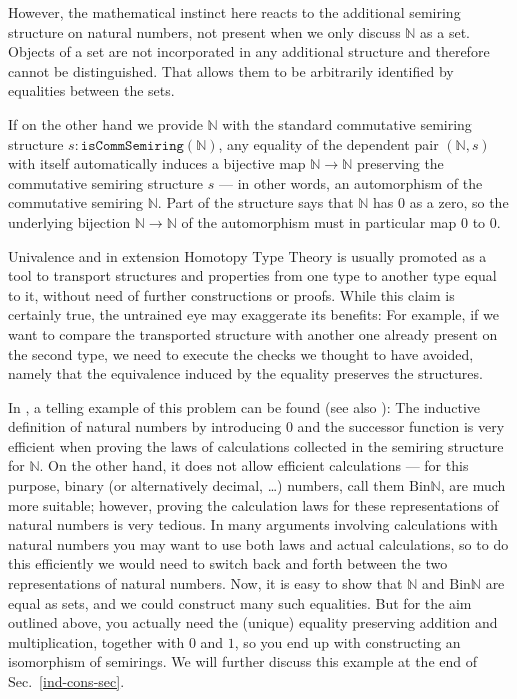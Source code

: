 \documentclass{amsart}
\theoremstyle{plain}
\numberwithin{equation}{section} %
\numberwithin{figure}{section} %
\theoremstyle{plain}
\theoremstyle{plain}
\theoremstyle{plain}
\theoremstyle{plain}
\theoremstyle{plain}
\theoremstyle{plain}
\theoremstyle{remark}
\theoremstyle{remark}
\theoremstyle{remark}
\begin{document}
However, the mathematical instinct here reacts to the additional semiring structure on natural numbers, not present when we only discuss $\mathbb{N}$ as a set. Objects of a set are not incorporated in any additional structure and therefore cannot be distinguished. That allows them to be arbitrarily identified by equalities between the sets.

If on the other hand we provide $\mathbb{N}$ with the standard commutative semiring structure $s : \mathtt{isCommSemiring}(\mathbb{N})$, any equality of the dependent pair $(\mathbb{N}, s)$ with itself automatically induces a bijective map $\mathbb{N} \rightarrow \mathbb{N}$ preserving the commutative semiring structure $s$ --- in other words, an automorphism of the commutative semiring $\mathbb{N}$. Part of the structure says that $\mathbb{N}$ has $0$ as a zero, so the underlying bijection $\mathbb{N} \rightarrow \mathbb{N}$ of the automorphism must in particular map $0$ to $0$. 

Univalence and in extension Homotopy Type Theory is usually promoted as a tool to transport structures and properties from one type to another type equal to it, without need of further constructions or proofs. While this claim is certainly true, the untrained eye may exaggerate its benefits: For example, if we want to compare the transported structure with another one already present on the second type, we need to execute the checks we thought to have avoided, namely that the equivalence induced by the equality preserves the structures. 

In \cite[2.1]{VMA21}, a telling example of this problem can be found (see also \cite[5.2]{HoTTBook}): The inductive definition of natural numbers by introducing $0$ and the successor function is very efficient when proving the laws of calculations collected in the semiring structure for $\mathbb{N}$. On the other hand, it does not allow efficient calculations --- for this purpose, binary (or alternatively decimal, \ldots) numbers, call them $\mathrm{Bin}\mathbb{N}$, are much more suitable; however, proving the calculation laws for these representations of natural numbers is very tedious. In many arguments involving calculations with natural numbers you may want to use both laws and actual calculations, so to do this efficiently we would need to switch back and forth between the two representations of natural numbers. Now, it is easy to show that $\mathbb{N}$ and $\mathrm{Bin}\mathbb{N}$ are equal as sets, and we could construct many such equalities. But for the aim outlined above, you actually need the (unique) equality preserving addition and multiplication, together with $0$ and $1$, so you end up with constructing an isomorphism of semirings. We will further discuss this example at the end of Sec.~\ref{ind-cons-sec}.
\end{document}
